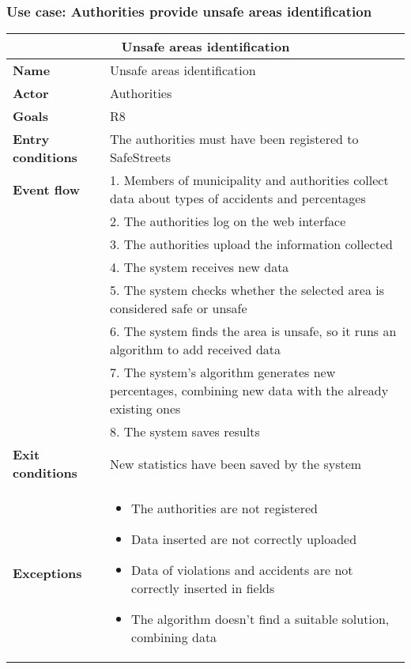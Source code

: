 \subsubsection{Use case: Authorities provide unsafe areas identification}
\begin{center}
    \begin{tabular}{|p{3cm}|p{7cm}|}
        \multicolumn{2}{c}{\textbf{Unsafe areas identification}} \\
        \hline
        \textbf{Name} & Unsafe areas identification \\
        \hline
        \textbf{Actor} & Authorities \\
        \hline
        \textbf{Goals} & R8 \\
        \hline
        \textbf{Entry conditions} & The authorities must have been registered to SafeStreets \\
        \hline
        \textbf{Event flow} & 1. Members of municipality and authorities collect data about types of accidents and percentages\\ 
        & 2. The authorities log on the web interface  \\ 
        & 3. The authorities upload the information collected \\
        & 4. The system receives new data \\
        & 5. The system checks whether the selected area is considered safe or unsafe \\ 
        & 6. The system finds the area is unsafe, so it runs an algorithm to add received data \\
        & 7. The system's algorithm generates new percentages, combining new data with the already existing ones \\
        & 8. The system saves results \\ 
        \hline
        \textbf{Exit conditions} & New statistics have been saved by the system \\
        \hline
        \textbf{Exceptions}
        & \begin{itemize}
            \item The authorities are not registered
            \item Data inserted are not correctly uploaded
            \item Data of violations and accidents are not correctly inserted in fields
            \item The algorithm doesn't find a suitable solution, combining data
        \end{itemize} \\
        \hline
    \end{tabular}
\end{center}

